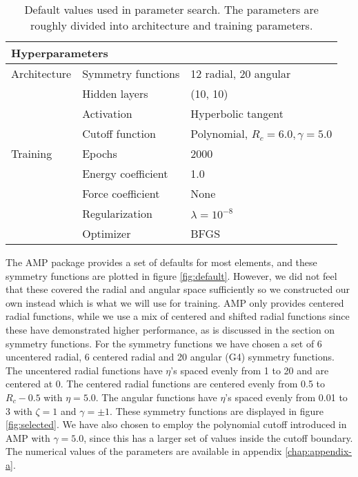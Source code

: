 \begin{table}[H]
\centering
\caption{Default values used in parameter search.
    The parameters are roughly divided into architecture and training parameters.}
\label{table:defaults}
\begin{tabular}{@{}lll@{}}
\toprule
\multicolumn{3}{l}{Hyperparameters}                                    \\ \midrule
Architecture & Symmetry functions & 12 radial, 20 angular               \\
             & Hidden layers      & (10, 10)                           \\
             & Activation         & Hyperbolic tangent                 \\
             & Cutoff function    & Polynomial, $R_c = 6.0, \gamma = 5.0$
             \\
Training     & Epochs             & 2000                               \\
             & Energy coefficient & 1.0                                \\
             & Force coefficient  & None                                \\
             & Regularization     & $\lambda = 10^{-8}$                \\
             & Optimizer          & BFGS                               \\ \bottomrule
\end{tabular}
\end{table}

The AMP package provides a set of defaults for most elements,
and these symmetry functions are plotted in figure \ref{fig:default}.
However, we did not feel that these covered the radial and angular space
sufficiently so we constructed our own instead which is what we will
use for training. AMP only provides centered radial functions,
while we use a mix of centered and shifted radial functions
since these have demonstrated higher performance, as is discussed
in the section on symmetry functions.
For the symmetry functions we have chosen a set of 6 uncentered radial,
6 centered radial and 20 angular (G4)
symmetry functions.
The uncentered radial functions have $\eta$'s spaced evenly
from 1 to 20 and are centered at 0. The centered radial functions
are centered evenly from 0.5 to $R_c - 0.5$ with $\eta = 5.0$.
The angular functions have $\eta$'s spaced evenly from
0.01 to 3 with $\zeta = 1$ and $\gamma = \pm 1$.
These symmetry functions are displayed in figure \ref{fig:selected}.
We have also chosen to employ the polynomial cutoff introduced in AMP
with $\gamma = 5.0$,
since this has a larger set of values inside the cutoff boundary.
The numerical values of the parameters are available in 
appendix \ref{chap:appendix-a}.

